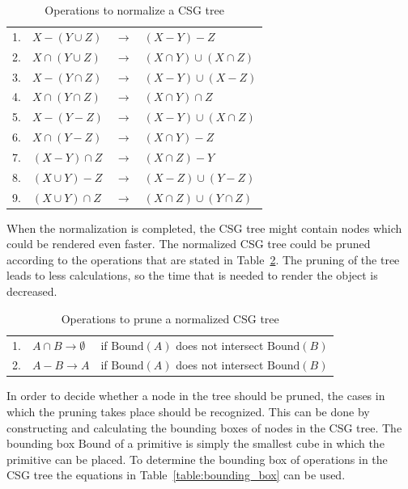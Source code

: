 \documentclass[a4paper,10pt,twocolumn]{article}
\newcommand{\Bound}{\mbox{Bound}}
\begin{document}
    \begin{table}[h]
        \begin{tabular}{llll}
            1. & $X - (Y \cup Z)$    & $\rightarrow$ & $(X - Y) - Z$\\
            2. & $X \cap (Y \cup Z)$ & $\rightarrow$ & $(X \cap Y) \cup (X \cap Z)$\\
            3. & $X - (Y \cap Z)$    & $\rightarrow$ & $(X - Y) \cup (X - Z)$\\
            4. & $X \cap (Y \cap Z)$ & $\rightarrow$ & $(X \cap Y) \cap Z$\\
            5. & $X - (Y - Z)$       & $\rightarrow$ & $(X - Y) \cup (X \cap Z)$\\
            6. & $X \cap (Y - Z)$    & $\rightarrow$ & $(X \cap Y) - Z$\\
            7. & $(X - Y) \cap Z$    & $\rightarrow$ & $(X \cap Z) - Y$\\
            8. & $(X \cup Y) - Z$    & $\rightarrow$ & $(X - Z) \cup (Y - Z)$\\
            9. & $(X \cup Y) \cap Z$ & $\rightarrow$ & $(X \cap Z) \cup (Y \cap Z)$\\
        \end{tabular}
        \caption{Operations to normalize a CSG tree}
        \label{table:normalize}
    \end{table}

    When the normalization is completed, the CSG tree might contain nodes which could be rendered even faster. The normalized CSG tree could be pruned according to the operations that are stated in Table~\ref{table:prune}. The pruning of the tree leads to less calculations, so the time that is needed to render the object is decreased.

    \begin{table}[h]
        \hspace{-0.8em}
        \begin{tabular}{p{} p{} p{} }
            1. & $A \cap B \rightarrow \emptyset$ & if $\Bound(A)$ does not intersect $\Bound(B)$\\
            2. & $A - B \rightarrow A$            & if $\Bound(A)$ does not intersect $\Bound(B)$\\
        \end{tabular}
        \caption{Operations to prune a normalized CSG tree}
        \label{table:prune}
    \end{table}

    In order to decide whether a node in the tree should be pruned, the cases in which the pruning takes place should be recognized. This can be done by constructing and calculating the bounding boxes of nodes in the CSG tree. The bounding box $\Bound$ of a primitive is simply the smallest cube in which the primitive can be placed. To determine the bounding box of operations in the CSG tree the equations in Table~\ref{table:bounding_box} can be used.
\end{document}
